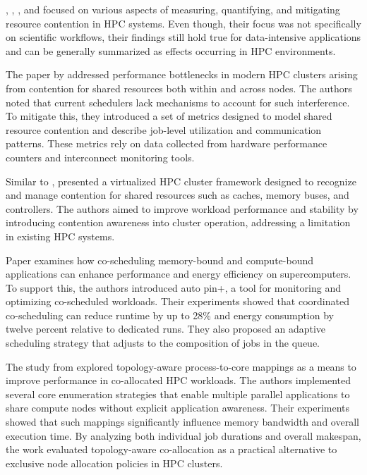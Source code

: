\cite{10.1145/1958746.1958815}, \cite{Blagodurov_2012}, \cite{7349920}, \cite{10.1007/978-3-031-48803-0_31} and \cite{10.1002/cpe.3187} focused on various aspects of measuring, quantifying, and mitigating resource contention in HPC systems. Even though, their focus was not specifically on scientific workflows, their findings still hold true for data-intensive applications and can be generally summarized as effects occurring in HPC environments.

The paper by \cite{10.1145/1958746.1958815} addressed performance bottlenecks in modern HPC clusters arising from contention for shared resources both within and across nodes. The authors noted that current schedulers lack mechanisms to account for such interference. To mitigate this, they introduced a set of metrics designed to model shared resource contention and describe job-level utilization and communication patterns. These metrics rely on data collected from hardware performance counters and interconnect monitoring tools.

Similar to \cite{10.1145/1958746.1958815}, \cite{Blagodurov_2012} presented a virtualized HPC cluster framework designed to recognize and manage contention for shared resources such as caches, memory buses, and controllers. The authors aimed to improve workload performance and stability by introducing contention awareness into cluster operation, addressing a limitation in existing HPC systems.

Paper \cite{7349920} examines how co-scheduling memory-bound and compute-bound applications can enhance performance and energy efficiency on supercomputers. To support this, the authors introduced auto pin+, a tool for monitoring and optimizing co-scheduled workloads. Their experiments showed that coordinated co-scheduling can reduce runtime by up to 28\% and energy consumption by twelve percent relative to dedicated runs. They also proposed an adaptive scheduling strategy that adjusts to the composition of jobs in the queue.

The study from \cite{10.1007/978-3-031-48803-0_31} explored topology-aware process-to-core mappings as a means to improve performance in co-allocated HPC workloads. The authors implemented several core enumeration strategies that enable multiple parallel applications to share compute nodes without explicit application awareness. Their experiments showed that such mappings significantly influence memory bandwidth and overall execution time. By analyzing both individual job durations and overall makespan, the work evaluated topology-aware co-allocation as a practical alternative to exclusive node allocation policies in HPC clusters.

